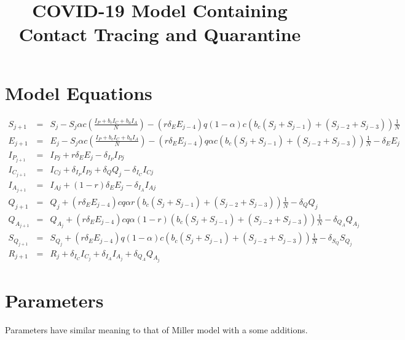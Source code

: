 \documentclass[12pt]{article}
\title{COVID-19 Model Containing Contact Tracing and Quarantine}
\date{}
\begin{document}
 

\maketitle

\section{Model Equations} \label{equations}

\begin{eqnarray}
S_{j+1} &=&  S_j - S_j \alpha c \left( \frac{I_P + b_cI_C + b_aI_A}{N}\right) -(r \delta_E E_{j-4} ) q (1-\alpha) c  (b_c (S_j + S_{j-1}) + (S_{j-2} + S_{j-3})) \frac{1}{N} \\
E_{j+1} &=& E_j - S_j \alpha c \left( \frac{I_P + b_cI_C + b_aI_A}{N}\right) -(r \delta_E E_{j-4} ) q \alpha c  (b_c (S_j + S_{j-1}) + (S_{j-2} + S_{j-3})) \frac{1}{N} - \delta_E E_j\\
I_{P_{j+1}} &=& I_{Pj} + r\delta_E E_j - \delta_{I_P} I_{Pj}\\
 I_{C_{j+1}}&=& I_{Cj} + \delta_{I_P} I_{Pj} + \delta_Q Q_j - \delta_{I_C} I_{Cj}\\
I_{A_{j+1}} &=& I_{Aj} + (1-r) \delta_E E_j  - \delta_{I_A} I_{Aj}\\
Q_{j+1} &=& Q_j + (r \delta_E E_{j-4} ) c q \alpha r (b_c (S_j + S_{j-1}) + (S_{j-2} + S_{j-3})) \frac{1}{N} - \delta_Q Q_j\\
 Q_{A_{j+1}}&=& Q_{A_{j}} +  (r \delta_E E_{j-4} ) c q \alpha (1- r) (b_c (S_j + S_{j-1}) + (S_{j-2} + S_{j-3})) \frac{1}{N} - \delta_{Q_{A}} Q_{A_{j}} \\
S_{Q_{j+1}} &=& S_{Q_{j}} + (r \delta_E E_{j-4} ) q (1- \alpha) c  (b_c (S_j + S_{j-1}) + (S_{j-2} + S_{j-3})) \frac{1}{N}  - \delta_{S_{Q}} S_{Q_{j}} \\
R_{j+1} &=& R_j + \delta_{I_{C}} I_{C_{j}} + \delta_{I_{A}} I_{A_{j}} + \delta_{Q_{A}} Q_{A_{j}}
\end{eqnarray}


\section{Parameters} \label{parameters}
Parameters have similar meaning to that of Miller model with a some additions.
\end{document}
